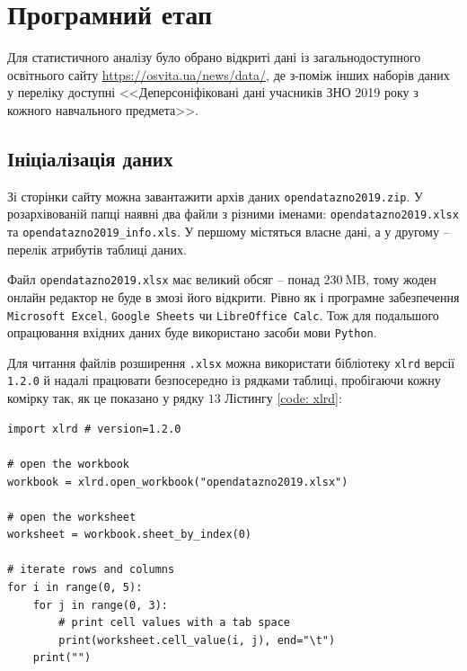 \section*{Програмний етап}

Для статистичного аналізу було обрано відкриті дані із загальнодоступного освітнього сайту 
\url{https://osvita.ua/news/data/}, де з-поміж інших наборів даних у переліку доступні 
<<Деперсоніфіковані дані учасників ЗНО 2019 року з кожного навчального предмета>>.

\subsection*{Ініціалізація даних}

Зі сторінки сайту можна завантажити архів даних \texttt{opendatazno2019.zip}. У роз\-архівованій папці 
наявні два файли з різними іменами: \texttt{opendatazno2019.xlsx} та \texttt{opendatazno2019\_info.xls}. 
У першому містяться власне дані, а у другому -- перелік атрибутів таблиці даних.  

Файл \texttt{opendatazno2019.xlsx} має великий обсяг -- понад $230\ \text{MB}$, тому жоден онлайн редактор не 
буде в змозі його відкрити. Рівно як і програмне забезпечення \texttt{Microsoft Excel}, \texttt{Google Sheets} чи \texttt{LibreOffice Calc}. Тож для подальшого опрацювання вхідних даних буде використано засоби мови \texttt{Python}. 

Для читання файлів розширення \texttt{.xlsx} можна використати бібліотеку \texttt{xlrd} версії \texttt{1.2.0} 
й надалі працювати безпосередно із рядками таблиці, пробігаючи кожну комірку так, як це показано у рядку $13$ 
Лістингу \ref{code: xlrd}:

% 

\begin{lstlisting}[firstnumber=1, label = code: xlrd, caption = Використання бібліотеки xlrd]
import xlrd # version=1.2.0

# open the workbook
workbook = xlrd.open_workbook("opendatazno2019.xlsx")
    
# open the worksheet
worksheet = workbook.sheet_by_index(0)
    
# iterate rows and columns
for i in range(0, 5):
    for j in range(0, 3):
        # print cell values with a tab space
        print(worksheet.cell_value(i, j), end="\t")
    print("")
\end{lstlisting}


